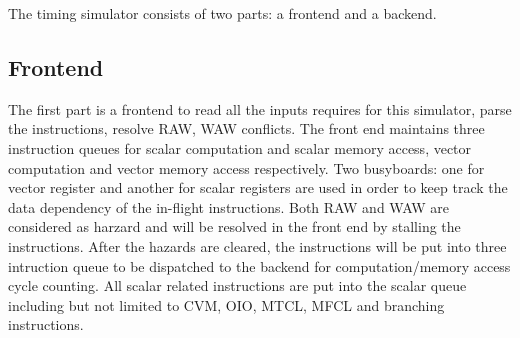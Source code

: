 \documentclass[conference]{IEEEtran}
\begin{document}
The timing simulator consists of two parts: a frontend and a backend. 

\subsection{Frontend}
The first part is a frontend to read all the inputs requires for this simulator, parse the instructions, resolve RAW, WAW conflicts. The front end maintains three instruction queues for scalar computation and scalar memory access, vector computation and vector memory access respectively. Two busyboards: one for vector register and another for scalar registers are used in order to keep track the data dependency of the in-flight instructions. Both RAW and WAW are considered as harzard and will be resolved in the front end by stalling the instructions. After the hazards are cleared, the instructions will be put into three intruction queue to be dispatched to the backend for computation/memory access cycle counting. All scalar related instructions are put into the scalar queue including but not limited to CVM, OIO, MTCL, MFCL and branching instructions. 
\end{document}
